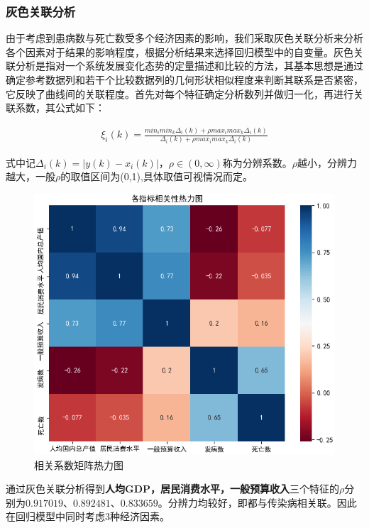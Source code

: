 \documentclass{whutmod}
\begin{document}
  \subsubsection{灰色关联分析}
  由于考虑到患病数与死亡数受多个经济因素的影响，我们采取灰色关联分析来分析各个因素对于结果的影响程度，根据分析结果来选择回归模型中的自变量。灰色关联分析是指对一个系统发展变化态势的定量描述和比较的方法，其基本思想是通过确定参考数据列和若干个比较数据列的几何形状相似程度来判断其联系是否紧密，它反映了曲线间的关联程度。首先对每个特征确定分析数列并做归一化，再进行关联系数，其公式如下：
  
  \begin{gather}
  \xi _{i}\left ( k \right )=\frac{min_{i} min_{k}\Delta _{i}(k)+\rho max_{i} max_{k}\Delta _{i}(k)}{\Delta _{i}(k)+\rho max_{i} max_{k}\Delta _{i}(k)}
  \end{gather}
  
  
  式中记$\Delta _{i}(k)=|y(k)-x_{i}(k)|$，$\rho \in (0,\infty )$称为分辨系数。$\rho $越小，分辨力越大，一般$\rho $的取值区间为(0,1),具体取值可视情况而定。
  \begin{figure}[H]
  	\centering
  	\includegraphics[width=.9\textwidth]{figures/Figure_8.png}
  	\caption{相关系数矩阵热力图}\label{re}
  \end{figure}
  
  通过灰色关联分析得到\textbf{人均GDP，居民消费水平，一般预算收入}三个特征的$\rho $分别为$0.917019$、$0.892481$、$0.833659$。分辨力均较好，即都与传染病相关联。因此在回归模型中同时考虑$3$种经济因素。
  
  
  
\end{document}
